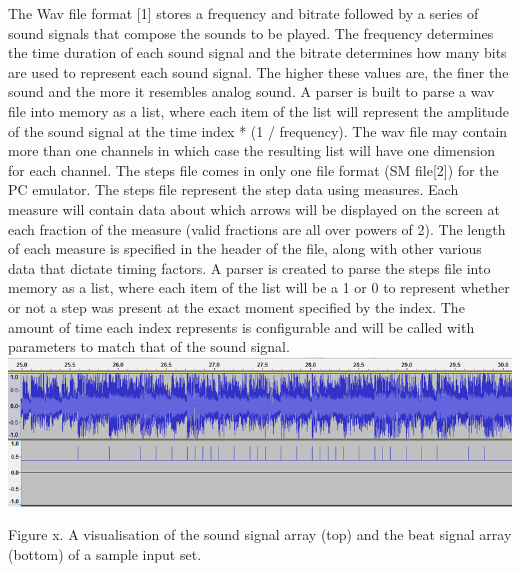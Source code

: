 The Wav file format [1] stores a frequency and bitrate followed by a series of sound signals that compose the sounds to be played. The frequency determines the time duration of each sound signal and the bitrate determines how many bits are used to represent each sound signal. The higher these values are, the finer the sound and the more it resembles analog sound. A parser is built to parse a wav file into memory as a list, where each item of the list will represent the amplitude of the sound signal at the time index * (1 / frequency). The wav file may contain more than one channels in which case the resulting list will have one dimension for each channel.
The steps file comes in only one file format (SM file[2]) for the PC emulator. The steps file represent the step data using measures. Each measure will contain data about which arrows will be displayed on the screen at each fraction of the measure (valid fractions are all over powers of 2). The length of each measure is specified in the header of the file, along with other various data that dictate timing factors. A parser is created to parse the steps file into memory as a list, where each item of the list will be a 1 or 0 to represent whether or not a step was present at the exact moment specified by the index. The amount of time each index represents is configurable and will be called with parameters to match that of the sound signal.\\

\includegraphics[scale=0.3]{signal_1.png}

Figure x. A visualisation of the sound signal array (top) and the beat signal array (bottom) of a sample input set.


